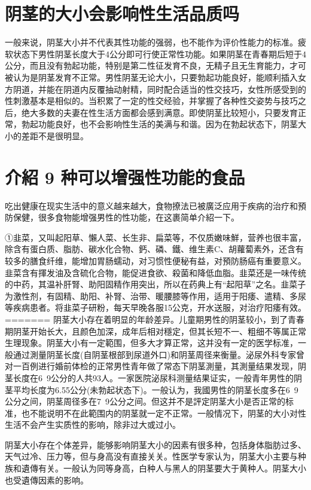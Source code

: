 \documentclass[12pt,UTF8]{ctexbook}
\begin{document}
\section{阴茎的大小会影响性生活品质吗}

一般来说，阴茎大小并不代表其性功能的强弱，也不能作为评价性能力的标准。疲软状态下男性阴茎长度大于4公分即可行使正常性功能。如果阴茎在青春期后短于4公分，而且没有勃起功能，特别是第二性征发育不良，无精子且无生育能力，才可被认为是阴茎发育不正常。男性阴茎无论大小，只要勃起功能良好，能顺利插入女方阴道，并能在阴道内反覆抽动射精，同时配合适当的性交技巧，女性所感受到的性刺激基本是相似的。当积累了一定的性交经验，并掌握了各种性交姿势与技巧之后，绝大多数的夫妻在性生活方面都会感到满意。即使阴茎比较短小，只要发育正常，勃起功能良好，也不会影响性生活的美满与和谐。因为在勃起状态下，阴茎大小的差距不是很明显。

\section{介紹 9 种可以增强性功能的食品}

吃出健康在现实生活中的意义越来越大，食物撩法已被廣泛应用于疾病的治疗和預防保健，很多食物能增强男性的性功能，在这裹简单介紹一下。

①韭菜，又叫起阳草、懶人菜、长生非、扁菜等，不仅质嫩味鮮，营养也很丰富，除含有蛋白质、脂肪、碳水化合物、鈣、磷、鐵、维生素C、胡蘿蔔素外，还含有较多的膳食纤维，能增加胃肠蠕动，对习惯性便秘有益，对預防肠癌有重要意义。韭菜含有揮发油及含硫化合物，能促进食欲、殺菌和降低血脂。韭菜还是一味传统的中药，其温补肝腎、助阳固精作用突出，所以在药典上有“起阳草”之名。韭菜子为激性剂，有固精、助阳、补腎、治带、暖腰膝等作用，适用于阳痿、遣精、多尿等疾病患者。将韭菜子研粉，每天早晚各服15公克，开水送服，对治疗阳痿有效。
=======
阴茎大小存在着明显的年龄差异。儿童期男性的阴茎较小，到了青春期阴茎开始长大，且颜色加深，成年后相对穩定，但其长短不一、粗细不等属正常生理现象。阴茎大小有一定範围，但多大才算正常，这并没有一定的医学标准，一般通过測量阴茎长度(自阴茎根部到尿道外口)和阴茎周径来衡量。泌尿外科专家曾对一百例进行婚前体检的正常男性青年做了常态下阴茎測量，其測量结果发现，阴茎长度在6~9公分的人共93人。一家医院泌尿科测量结果证实，一般青年男性的阴茎平均长度为6.55公分(未勃起状态下)。一般认为，我國男性的阴茎长度多在6~9公分之间，阴茎周径多在7~9公分之间。但这并不是評定阴茎大小是否正常的标准，也不能说明不在此範围内的阴茎就一定不正常。一般情况下，阴茎的大小对性生活不会产生实质性的影响，除非过大或过小。

阴茎大小存在个体差异，能够影响阴茎大小的因素有很多种，包括身体脂肪过多、天气过冷、压力等，但与身高没有直接关关。性医学专家认为，阴茎大小主要与种族和遺傳有关。一般认为同等身高，白种人与黑人的阴茎要大于黄种人。阴茎大小也受遺傳因素的影响。
\end{document}

